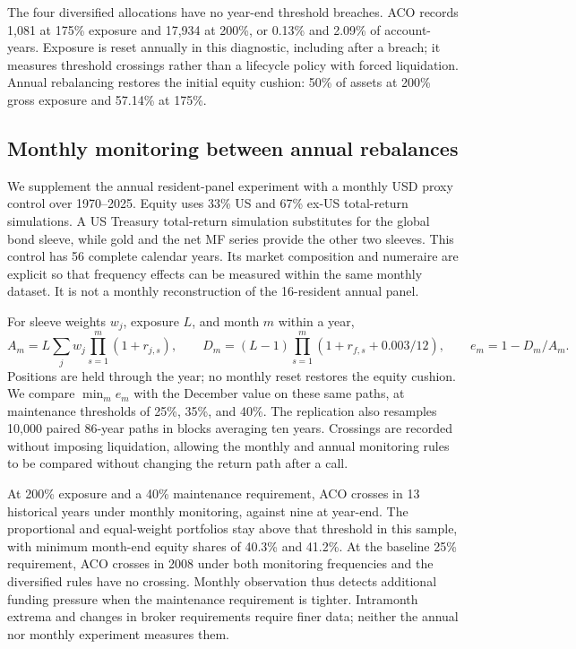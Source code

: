 The four diversified allocations have no year-end threshold breaches.
ACO records 1,081 at 175\% exposure and 17,934 at 200\%, or 0.13\% and
2.09\% of account-years. Exposure is reset annually in this diagnostic,
including after a breach; it measures threshold crossings rather than a
lifecycle policy with forced liquidation. Annual rebalancing restores the
initial equity cushion: 50\% of assets at 200\% gross exposure and 57.14\%
at 175\%.

\subsection{Monthly monitoring between annual rebalances}
We supplement the annual resident-panel experiment with a monthly USD proxy
control over 1970--2025. Equity uses 33\% US and 67\% ex-US total-return
simulations. A US Treasury total-return simulation substitutes for the global
bond sleeve, while gold and the net MF series provide the other two sleeves.
This control has 56 complete calendar years. Its market composition and
numeraire are explicit so that frequency effects can be measured within the
same monthly dataset. It is not a monthly reconstruction of the 16-resident
annual panel.

For sleeve weights $w_j$, exposure $L$, and month $m$ within a year,
\[
 A_m=L\sum_jw_j\prod_{s=1}^m(1+r_{j,s}),\qquad
 D_m=(L-1)\prod_{s=1}^m(1+r_{f,s}+0.003/12),\qquad
 e_m=1-D_m/A_m.
\]
Positions are held through the year; no monthly reset restores the equity
cushion. We compare $\min_m e_m$ with the December value on these same paths,
at maintenance thresholds of 25\%, 35\%, and 40\%. The replication also
resamples 10,000 paired 86-year paths in blocks averaging ten years. Crossings
are recorded without imposing liquidation, allowing the monthly and annual
monitoring rules to be compared without changing the return path after a call.



At 200\% exposure and a 40\% maintenance requirement, ACO crosses in 13
historical years under monthly monitoring, against nine at year-end. The
proportional and equal-weight portfolios stay above that threshold in this
sample, with minimum month-end equity shares of 40.3\% and 41.2\%.
At the baseline 25\% requirement, ACO crosses in 2008 under both monitoring
frequencies and the diversified rules have no crossing. Monthly observation
thus detects additional funding pressure when the maintenance requirement is
tighter. Intramonth extrema and changes in broker requirements require finer
data; neither the annual nor monthly experiment measures them.

